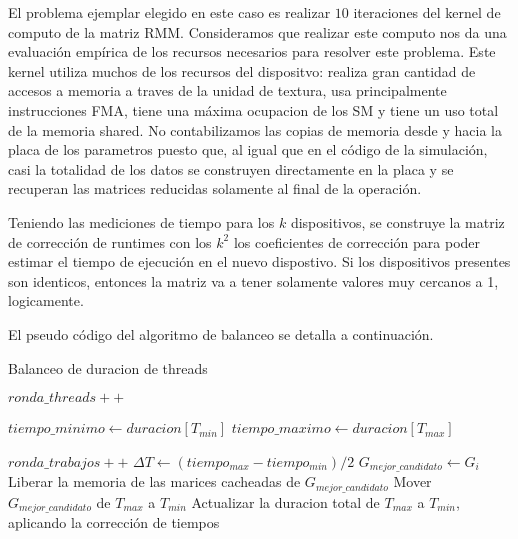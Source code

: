 El problema ejemplar elegido en este caso es realizar $10$ iteraciones del kernel de computo de la matriz RMM.
Consideramos que realizar este computo nos da una evaluaci\'on
emp\'irica de los recursos necesarios para resolver este problema. Este kernel utiliza muchos
de los recursos del dispositvo: realiza gran cantidad de accesos a memoria a traves
de la unidad de textura, usa principalmente instrucciones FMA, tiene una m\'axima ocupacion de los SM
y tiene un uso total de la memoria shared. No contabilizamos las copias de memoria desde y hacia la
placa de los parametros puesto que, al igual que en el c\'odigo de la simulaci\'on, casi la totalidad
de los datos se construyen directamente en la placa y se recuperan las matrices reducidas solamente al final
de la operaci\'on.

Teniendo las mediciones de tiempo para los $k$ dispositivos, se construye la matriz de
correcci\'on de runtimes con los $k^2$ los coeficientes de correcci\'on para poder estimar el tiempo de
ejecuci\'on en el nuevo dispostivo. Si los dispositivos presentes son identicos, entonces
la matriz va a tener solamente valores muy cercanos a 1, logicamente.

El pseudo c\'odigo del algoritmo de balanceo se detalla a continuaci\'on.
\begin{algorithm}
  \caption{Balanceo de duracion de threads}
  \label{ThreadBalancing}
\begin{algorithmic}
    \State $ronda\_threads++$

    \State $tiempo\_minimo \gets duracion[T_{min}]$
    \State $tiempo\_maximo \gets duracion[T_{max}]$

      \State $ronda\_trabajos++$
      \State $\Delta T \gets (tiempo_{max} - tiempo_{min}) /2$
          \State $G_{mejor\_candidato} \gets G_i$
        \EndIf
      \EndFor
     \State Liberar la memoria de las marices cacheadas de $G_{mejor\_candidato}$
     \State Mover $G_{mejor\_candidato}$ de $T_{max}$ a $T_{min}$
     \State Actualizar la duracion total de $T_{max}$ a $T_{min}$, aplicando la correcci\'on de tiempos
    \EndWhile
  \EndWhile
\end{algorithmic}
\end{algorithm}

